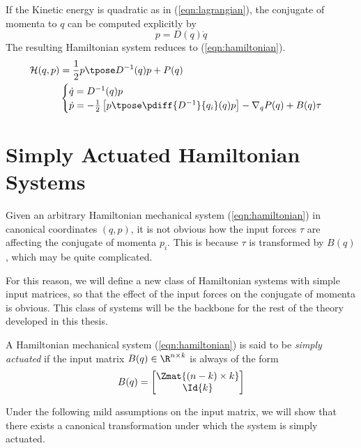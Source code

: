 If the Kinetic energy is quadratic as in (\ref{eqn:lagrangian}), the conjugate of
momenta to \(q\) can be computed explicitly by
\[
    p = D(q)\dot{q}
\]
The resulting Hamiltonian system reduces to (\ref{eqn:hamiltonian}).
\begin{align}\label{eqn:hamiltonian}
    \mathcal{H}(q,p) &= \frac{1}{2} p\tpose D^{-1}(q) p + P(q) \\
                     &\begin{cases}
        \dot{q} = D^{-1}(q)p \\
        \dot{p} = -\frac{1}{2} \left[p\tpose \pdiff{D^{-1}}{q_i}(q) p\right] 
        - \nabla_q P(q) + B(q) \tau \\
    \end{cases} 
\end{align}

\section{Simply Actuated Hamiltonian Systems}
Given an arbitrary Hamiltonian mechanical system (\ref{eqn:hamiltonian}) in
canonical coordinates \((q,p)\), it is not obvious how the input forces \(\tau\)
are affecting the conjugate of momenta \(p_i\). This is because \(\tau\) is
transformed by \(B(q)\), which may be quite complicated. 

For this reason, we will define a new class of Hamiltonian systems with simple
input matrices, so that the effect of the input forces on the conjugate of
momenta is obvious. This class of systems will be the backbone for the rest of
the theory developed in this thesis.

\begin{defn}
    A Hamiltonian mechanical system (\ref{eqn:hamiltonian}) is said to be 
    \textit{simply actuated} if the input matrix \(B(q) \in \R^{n \times k}\)
    is always of the form
    \[
        B(q) = \begin{bmatrix}
            \Zmat{(n-k)\times k} \\
            \Id{k}
        \end{bmatrix}
    \]
\end{defn}

Under the following mild assumptions on the input matrix, we will show that
there exists a canonical transformation under which the system is simply
actuated.

